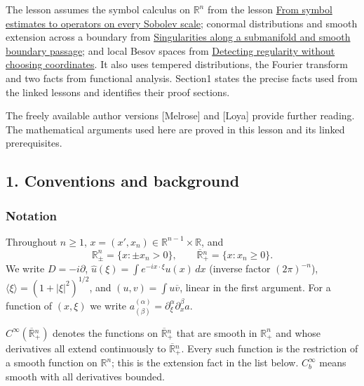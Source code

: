 \documentclass[
  11pt,
]{article}
\begin{document}
The lesson assumes the symbol calculus on \(\mathbb R^n\) from the
lesson \href{euclidean-symbol-calculus.pdf}{From symbol estimates to
operators on every Sobolev scale}; conormal distributions and smooth
extension across a boundary from
\href{conormal-transmission.pdf}{Singularities along a submanifold and
smooth boundary passage}; and local Besov spaces from
\href{geometric-microlocal-calculus.pdf}{Detecting regularity without
choosing coordinates}. It also uses tempered distributions, the Fourier
transform and two facts from functional analysis. Section1 states the
precise facts used from the linked lessons and identifies their proof
sections.

The freely available author versions {[}Melrose{]} and {[}Loya{]}
provide further reading. The mathematical arguments used here are proved
in this lesson and its linked prerequisites.

\subsection{1. Conventions and
background}\label{conventions-and-background}

\subsubsection{Notation}\label{notation}

Throughout \(n\geq1\), \(x=(x',x_n)\in\mathbb R^{n-1}\times\mathbb R\),
and \[
\mathbb R^n_\pm=\{x:\pm x_n>0\},\qquad \overline{\mathbb R}{}^n_+=\{x:x_n\geq0\}.
\] We write \(D=-i\partial\),
\(\widehat u(\xi)=\int e^{-ix\cdot\xi}u(x)\,dx\) (inverse factor
\((2\pi)^{-n}\)), \(\langle\xi\rangle=(1+|\xi|^2)^{1/2}\), and
\((u,v)=\int u\overline v\), linear in the first argument. For a
function of \((x,\xi)\) we write
\(a^{(\alpha)}_{(\beta)}=\partial_\xi^\alpha\partial_x^\beta a\).

\(C^\infty(\overline{\mathbb R}{}^n_+)\) denotes the functions on
\(\overline{\mathbb R}{}^n_+\) that are smooth in \(\mathbb R^n_+\) and
whose derivatives all extend continuously to
\(\overline{\mathbb R}{}^n_+\). Every such function is the restriction
of a smooth function on \(\mathbb R^n\); this is the extension fact in
the list below. \(C^\infty_b\) means smooth with all derivatives
bounded.
\end{document}
